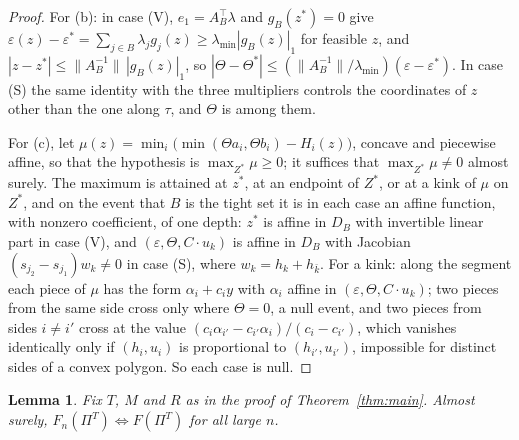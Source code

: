 \documentclass[11pt]{amsart}
\newtheorem{lemma}[theorem]{Lemma}
\theoremstyle{remark}\newtheorem{remark}[theorem]{Remark}
\begin{document}
\begin{proof}
For (b): in case (V), $e_1=A_B^\top\lambda$ and $g_B(z^*)=0$ give
$\varepsilon(z)-\varepsilon^*=\sum_{j\in B}\lambda_jg_j(z)\ge\lambda_{\min}|g_B(z)|_1$ for feasible $z$, and
$|z-z^*|\le\|A_B^{-1}\|\,|g_B(z)|_1$, so $|\Theta-\Theta^*|\le(\|A_B^{-1}\|/\lambda_{\min})(\varepsilon-\varepsilon^*)$.
In case (S) the same identity with the three multipliers controls the coordinates of $z$ other than the one along
$\tau$, and $\Theta$ is among them.

For (c), let $\mu(z)=\min_i\big(\min(\Theta a_i,\Theta b_i)-H_i(z)\big)$, concave and piecewise affine, so that the
hypothesis is $\max_{Z^*}\mu\ge0$; it suffices that $\max_{Z^*}\mu\ne0$ almost surely. The maximum is attained at
$z^*$, at an endpoint of $Z^*$, or at a kink of $\mu$ on $Z^*$, and on the event that $B$ is the tight set it is in
each case an affine function, with nonzero coefficient, of one depth: $z^*$ is affine in $D_B$ with invertible linear
part in case (V), and $(\varepsilon,\Theta,C\cdot u_k)$ is affine in $D_B$ with Jacobian $(s_{j_2}-s_{j_1})w_k\ne0$
in case (S), where $w_k=h_k+h_{\bar k}$. For a kink: along the segment each piece of $\mu$ has the form
$\alpha_i+c_iy$ with $\alpha_i$ affine in $(\varepsilon,\Theta,C\cdot u_k)$; two pieces from the same side cross only
where $\Theta=0$, a null event, and two pieces from sides $i\ne i'$ cross at the value
$(c_i\alpha_{i'}-c_{i'}\alpha_i)/(c_i-c_{i'})$, which vanishes identically only if $(h_i,u_i)$ is proportional to
$(h_{i'},u_{i'})$, impossible for distinct sides of a convex polygon. So each case is null.
\end{proof}

\begin{lemma}\label{lem:stab}
Fix $T$, $M$ and $R$ as in the proof of Theorem~\ref{thm:main}. Almost surely, $F_n(\Pi^T)\Leftrightarrow F(\Pi^T)$
for all large $n$.
\end{lemma}
\end{document}
